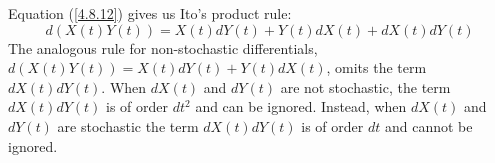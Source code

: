 \documentclass[\topdir/lecture\_notes.tex]{subfiles}
\begin{document}
Equation (\ref{4.8.12}) gives us Ito's product rule:
\begin{equation*}
d(X(t) Y(t))=X(t) d Y(t)+Y(t) d X(t)+d X(t) d Y(t)
\end{equation*}
The analogous rule for non-stochastic differentials, \(d(X(t) Y(t))=X(t) d Y(t)+Y(t) d X(t)\), omits the term \(dX(t) dY(t)\). When \(dX(t)\) and \(dY(t)\) are not stochastic, the term \(dX(t) dY(t)\) is of order \(dt^2\) and can be ignored. Instead, when \(dX(t)\) and \(dY(t)\) are stochastic the term \(dX(t) dY(t)\) is of order \(dt\) and cannot be ignored.





\end{document}
